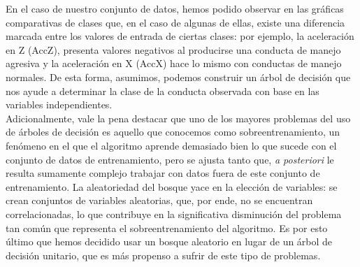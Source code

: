 \documentclass[spanish,12pt,letterpaper]{article}
\begin{document}
\begin{itemize}
    En el caso de nuestro conjunto de datos, hemos podido observar en las gráficas comparativas de clases que, en el caso de algunas de ellas, existe una diferencia marcada entre los valores de entrada de ciertas clases: por ejemplo, la aceleración en Z (AccZ), presenta valores negativos al producirse una conducta de manejo agresiva y la aceleración en X (AccX) hace lo mismo con conductas de manejo normales. De esta forma, asumimos, podemos construir un árbol de decisión que nos ayude a determinar la clase de la conducta observada con base en las variables independientes. \\
    Adicionalmente, vale la pena destacar que uno de los mayores problemas del uso de árboles de decisión es aquello que conocemos como sobreentrenamiento, un fenómeno en el que el algoritmo aprende demasiado bien lo que sucede con el conjunto de datos de entrenamiento, pero se ajusta tanto que, \textit{a posteriori} le resulta sumamente complejo trabajar con datos fuera de este conjunto de entrenamiento. La aleatoriedad del bosque yace en la elección de variables: se crean conjuntos de variables aleatorias, que, por ende, no se encuentran correlacionadas, lo que contribuye en la significativa disminución del problema tan común que representa el sobreentrenamiento del algoritmo. Es por esto último que hemos decidido usar un bosque aleatorio en lugar de un árbol de decisión unitario, que es más propenso a sufrir de este tipo de problemas.
    
    \newpage
    

\end{itemize}
\end{document}
